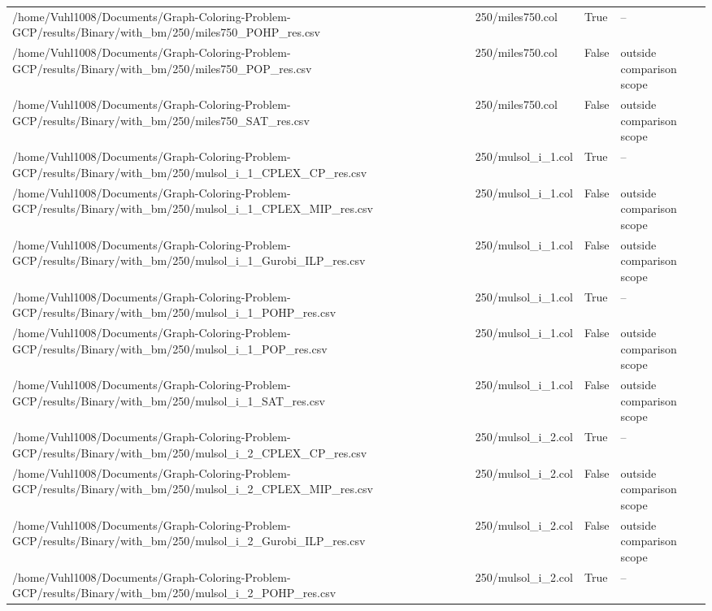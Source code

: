 \begin{table}[htbp]
\begin{tabular}{llll}
/home/Vuhl1008/Documents/Graph-Coloring-Problem-GCP/results/Binary/with\_bm/250/miles750\_POHP\_res.csv & 250/miles750.col & True & -- \\
/home/Vuhl1008/Documents/Graph-Coloring-Problem-GCP/results/Binary/with\_bm/250/miles750\_POP\_res.csv & 250/miles750.col & False & outside comparison scope \\
/home/Vuhl1008/Documents/Graph-Coloring-Problem-GCP/results/Binary/with\_bm/250/miles750\_SAT\_res.csv & 250/miles750.col & False & outside comparison scope \\
/home/Vuhl1008/Documents/Graph-Coloring-Problem-GCP/results/Binary/with\_bm/250/mulsol\_i\_1\_CPLEX\_CP\_res.csv & 250/mulsol\_i\_1.col & True & -- \\
/home/Vuhl1008/Documents/Graph-Coloring-Problem-GCP/results/Binary/with\_bm/250/mulsol\_i\_1\_CPLEX\_MIP\_res.csv & 250/mulsol\_i\_1.col & False & outside comparison scope \\
/home/Vuhl1008/Documents/Graph-Coloring-Problem-GCP/results/Binary/with\_bm/250/mulsol\_i\_1\_Gurobi\_ILP\_res.csv & 250/mulsol\_i\_1.col & False & outside comparison scope \\
/home/Vuhl1008/Documents/Graph-Coloring-Problem-GCP/results/Binary/with\_bm/250/mulsol\_i\_1\_POHP\_res.csv & 250/mulsol\_i\_1.col & True & -- \\
/home/Vuhl1008/Documents/Graph-Coloring-Problem-GCP/results/Binary/with\_bm/250/mulsol\_i\_1\_POP\_res.csv & 250/mulsol\_i\_1.col & False & outside comparison scope \\
/home/Vuhl1008/Documents/Graph-Coloring-Problem-GCP/results/Binary/with\_bm/250/mulsol\_i\_1\_SAT\_res.csv & 250/mulsol\_i\_1.col & False & outside comparison scope \\
/home/Vuhl1008/Documents/Graph-Coloring-Problem-GCP/results/Binary/with\_bm/250/mulsol\_i\_2\_CPLEX\_CP\_res.csv & 250/mulsol\_i\_2.col & True & -- \\
/home/Vuhl1008/Documents/Graph-Coloring-Problem-GCP/results/Binary/with\_bm/250/mulsol\_i\_2\_CPLEX\_MIP\_res.csv & 250/mulsol\_i\_2.col & False & outside comparison scope \\
/home/Vuhl1008/Documents/Graph-Coloring-Problem-GCP/results/Binary/with\_bm/250/mulsol\_i\_2\_Gurobi\_ILP\_res.csv & 250/mulsol\_i\_2.col & False & outside comparison scope \\
/home/Vuhl1008/Documents/Graph-Coloring-Problem-GCP/results/Binary/with\_bm/250/mulsol\_i\_2\_POHP\_res.csv & 250/mulsol\_i\_2.col & True & -- \\

\end{tabular}
\end{table}
